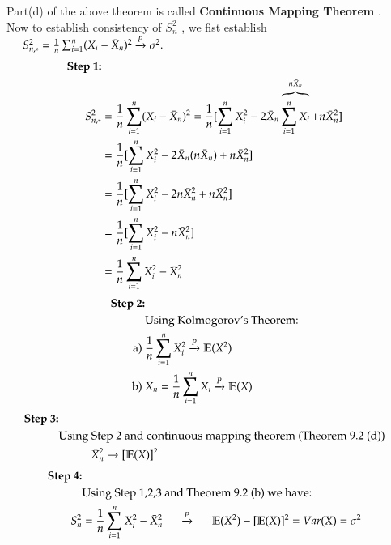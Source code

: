 \documentclass[14pt,twoside,a4paper,fleqn]{article}
\theoremstyle{plain}
\begin{document}
Part(d) of the above theorem is called \textbf{Continuous Mapping Theorem} .\\
Now to establish consistency of $S^2_n$ , we fist establish \mbox{$\tab[0.5cm] S^2_{n,*} = \frac{1}{n}\sum_{i=1}^n (X_i - \bar{X}_n)^2 \xrightarrow{P} \sigma^2 .$}
	\begin{equation*}
	\begin{split}
		\text{\textbf{Step 1:}}\\
		S^2_{n,*} &= \frac{1}{n} \sum_{i=1}^n (X_i-\bar{X}_n)^2 = \frac{1}{n}[\sum_{i=1}^n X_i^2 -2\bar{X}_n\overbrace{\sum_{i=1}^nX_i}^{n\bar{X}_n} + n\bar{X}_n^2]\\
		&= \frac{1}{n} [\sum_{i=1}^n X_i^2 - 2\bar{X}_n(n\bar{X}_n)+n\bar{X}_n^2]\\
		&= \frac{1}{n}[\sum_{i=1}^n X_i^2 -2n\bar{X}^2_n + n\bar{X}^2_n]\\
		&= \frac{1}{n}[\sum_{i=1}^n X_i^2 - n\bar{X}_n^2]\\
		&= \frac{1}{n}\sum_{i=1}^n X_i^2 - \bar{X}^2_n
	\end{split}
	\end{equation*}
	\begin{equation*}
	\begin{split}
		\text{\textbf{Step 2:}}\\
		&\text{Using Kolmogorov's Theorem:}\\
		\text{a)\ } &\frac{1}{n} \sum_{i=1}^n X_i^2 \xrightarrow{P} \mathbb{E}(X^2)\\
		\text{b)\ } &\bar{X}_n = \frac{1}{n} \sum_{i=1}^n X_i \xrightarrow{P} \mathbb{E}(X)
	\end{split}
	\end{equation*}			
	\begin{equation*}
	\begin{split}
		\text{\textbf{Step 3:}}\\
		&\text{Using Step 2 and continuous mapping theorem (Theorem 9.2 (d))}\\
		&\tab \bar{X}_n^2 \to [\mathbb{E}(X)]^2
	\end{split}
	\end{equation*}
	\begin{equation*}
	\begin{split}
		\text{\textbf{Step 4:}}\\
		&\text{Using Step 1,2,3 and Theorem 9.2 (b) we have:}\\
		S^2_n &= \frac{1}{n} \sum_{i=1}^n X_i^2 - \bar{X}_n^2 \tab[0.5cm]\xrightarrow{P}\tab[0.5cm]\mathbb{E}(X^2) - [\mathbb{E}(X)]^2 = Var(X) = \sigma^2
	\end{split}
	\end{equation*}
\end{document}
